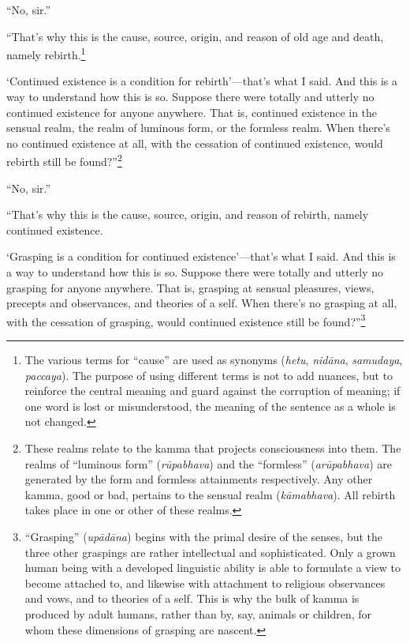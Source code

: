 \documentclass[12pt,openany]{book}%
\begin{document}
“No, sir.” 

“That’s why this is the cause, source, origin, and reason of old age and death, namely rebirth.\footnote{The various terms for “cause” are used as synonyms (\textit{hetu}, \textit{\textsanskrit{nidāna}}, \textit{samudaya}, \textit{paccaya}). The purpose of using different terms is not to add nuances, but to reinforce the central meaning and guard against the corruption of meaning; if one word is lost or misunderstood, the meaning of the sentence as a whole is not changed. } 

‘Continued existence is a condition for rebirth’—that’s what I said. And this is a way to understand how this is so. Suppose there were totally and utterly no continued existence for anyone anywhere. That is, continued existence in the sensual realm, the realm of luminous form, or the formless realm. When there’s no continued existence at all, with the cessation of continued existence, would rebirth still be found?”\footnote{These realms relate to the kamma that projects consciousness into them. The realms of “luminous form” (\textit{\textsanskrit{rūpabhava}}) and the “formless” (\textit{\textsanskrit{arūpabhava}}) are generated by the form and formless attainments respectively. Any other kamma, good or bad, pertains to the sensual realm (\textit{\textsanskrit{kāmabhava}}). All rebirth takes place in one or other of these realms. } 

“No, sir.” 

“That’s why this is the cause, source, origin, and reason of rebirth, namely continued existence. 

‘Grasping is a condition for continued existence’—that’s what I said. And this is a way to understand how this is so. Suppose there were totally and utterly no grasping for anyone anywhere. That is, grasping at sensual pleasures, views, precepts and observances, and theories of a self. When there’s no grasping at all, with the cessation of grasping, would continued existence still be found?”\footnote{“Grasping” (\textit{\textsanskrit{upādāna}}) begins with the primal desire of the senses, but the three other graspings are rather intellectual and sophisticated. Only a grown human being with a developed linguistic ability is able to formulate a view to become attached to, and likewise with attachment to religious observances and vows, and to theories of a self. This is why the bulk of kamma is produced by adult humans, rather than by, say, animals or children, for whom these dimensions of grasping are nascent. } 
\end{document}
